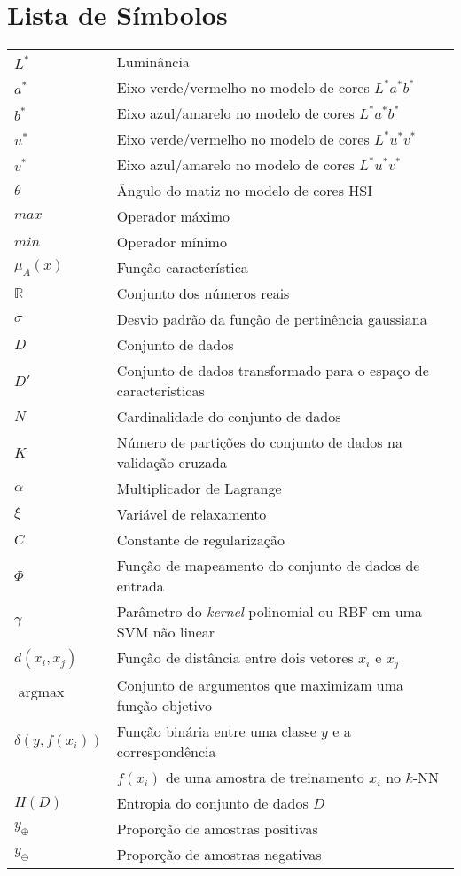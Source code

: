 \documentclass[11pt,twoside,a4paper]{book}
\theoremstyle{plain}
\theoremstyle{definition}
\DeclareMathOperator*{\argmax}{argmax}
\begin{document}
\chapter{Lista de Símbolos}
\begin{tabular}{ll}
    $L^*$       & Luminância \\
    $a^*$       & Eixo verde/vermelho no modelo de cores $L^*a^*b^*$ \\
    $b^*$       & Eixo azul/amarelo no modelo de cores $L^*a^*b^*$ \\
    $u^*$       & Eixo verde/vermelho no modelo de cores $L^*u^*v^*$ \\
    $v^*$       & Eixo azul/amarelo no modelo de cores $L^*u^*v^*$ \\
    $\theta$    & Ângulo do matiz no modelo de cores HSI\\
    $max$       & Operador máximo\\
    $min$       & Operador mínimo\\
    $\mu_A(x)$  & Função característica\\
    $\mathbb{R}$& Conjunto dos números reais\\
    $\sigma$    & Desvio padrão da função de pertinência gaussiana\\
    $D$         & Conjunto de dados\\
    $D'$        & Conjunto de dados transformado para o espaço de características\\
    $N$         & Cardinalidade do conjunto de dados\\
    $K$         & Número de partições do conjunto de dados na validação cruzada\\
    $\alpha$    & Multiplicador de Lagrange\\
    $\xi$       & Variável de relaxamento\\
    $C$         & Constante de regularização\\
    $\Phi$      & Função de mapeamento do conjunto de dados de entrada\\
    $\gamma$    & Parâmetro do \emph{kernel} polinomial ou RBF em uma SVM não linear\\
    $d(x_i, x_j)$ & Função de distância entre dois vetores $x_i$ e $x_j$\\
    $\argmax$   & Conjunto de argumentos que maximizam uma função objetivo\\
    $\delta (y, f(x_i))$ & Função binária entre uma classe $y$ e a correspondência \\
                & $f(x_i)$ de uma amostra de treinamento $x_i$ no $k$-NN\\
    $H(D)$      & Entropia do conjunto de dados $D$\\
    $y_\oplus$  & Proporção de amostras positivas\\
    $y_\ominus$ & Proporção de amostras negativas\\
\end{tabular}
\end{document}
